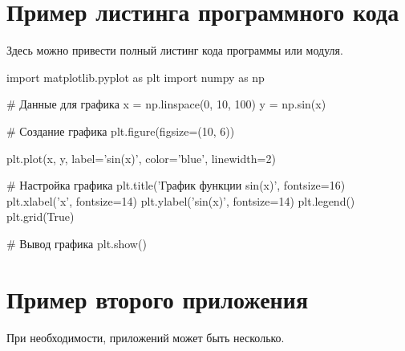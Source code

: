 %
\chapter{Пример листинга программного кода}\label{app:A}\vspace{\baselineskip}

Здесь можно привести полный листинг кода программы или модуля.

\begin{code}
import matplotlib.pyplot as plt
import numpy as np

# Данные для графика
x = np.linspace(0, 10, 100)
y = np.sin(x)

# Создание графика
plt.figure(figsize=(10, 6))

plt.plot(x, y, label='sin(x)', color='blue', linewidth=2)

# Настройка графика
plt.title('График функции sin(x)', fontsize=16)
plt.xlabel('x', fontsize=14)
plt.ylabel('sin(x)', fontsize=14)
plt.legend()
plt.grid(True)

# Вывод графика
plt.show()    
\end{code}

\chapter{Пример второго приложения}\label{app:B}\vspace{\baselineskip}

При необходимости, приложений может быть несколько.
